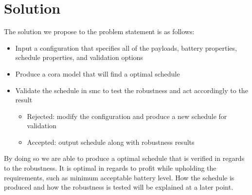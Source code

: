 \section{Solution} \label{sec:solution}
The solution we propose to the problem statement is as follows:
\begin{itemize}
	\item	Input a configuration that specifies all of the payloads, battery properties, schedule properties, and validation options
	\item	Produce a \gls{cora} model that will find a optimal schedule
	\item	Validate the schedule in \gls{smc} to test the robustness and act accordingly to the result
	\begin{itemize}
		\item	Rejected: modify the configuration and produce a new schedule for validation
		\item	Accepted: output schedule along with robustness results
	\end{itemize}
\end{itemize}

By doing so we are able to produce a optimal schedule that is verified in regards to the robustness.
It is optimal in regards to profit while upholding the requirements, such as minimum acceptable battery level.
How the schedule is produced and how the robustness is tested will be explained at a later point.
